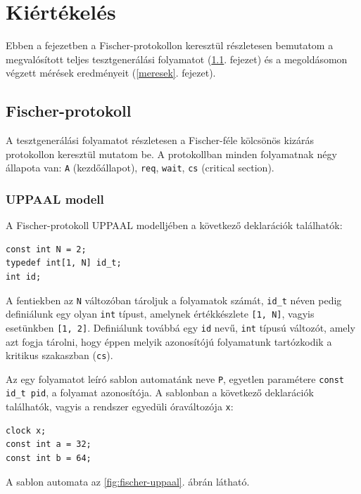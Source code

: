 
\chapter{Kiértékelés} \label{esettanulmany}

Ebben a fejezetben a Fischer-protokollon keresztül részletesen bemutatom a megvalósított teljes tesztgenerálási folyamatot (\ref{fischer}. fejezet) és a megoldásomon végzett mérések eredményeit (\ref{meresek}. fejezet).

\section{Fischer-protokoll} \label{fischer}

A tesztgenerálási folyamatot részletesen a Fischer-féle kölcsönös kizárás protokollon keresztül mutatom be. A protokollban minden folyamatnak négy állapota van: \texttt{A} (kezdőállapot), \texttt{req}, \texttt{wait}, \texttt{cs} (critical section).

\subsection{UPPAAL modell} \label{UPPAALmodell}
A Fischer-protokoll UPPAAL modelljében a következő deklarációk találhatók:

\begin{verbatim}
const int N = 2;
typedef int[1, N] id_t;
int id;
\end{verbatim}

A fentiekben az \texttt{N} változóban tároljuk a folyamatok számát, \texttt{id\_t} néven pedig definiálunk egy olyan \texttt{int} típust, amelynek értékkészlete \texttt{[1, N]}, vagyis esetünkben \texttt{[1, 2]}. Definiálunk továbbá egy \texttt{id} nevű, \texttt{int} típusú változót, amely azt fogja tárolni, hogy éppen melyik azonosítójú folyamatunk tartózkodik a kritikus szakaszban (\texttt{cs}).

Az egy folyamatot leíró sablon automatánk neve \texttt{P}, egyetlen paramétere \texttt{const id\_t pid}, a folyamat azonosítója. A sablonban a következő deklarációk találhatók, vagyis a rendszer egyedüli óraváltozója \texttt{x}:

\begin{verbatim}
clock x;
const int a = 32;
const int b = 64;
\end{verbatim}

A sablon automata az \ref{fig:fischer-uppaal}. ábrán látható.

